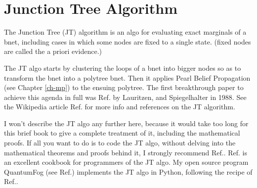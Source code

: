 \chapter{Junction Tree Algorithm}
\label{ch-junc-tree}
The Junction Tree (JT)
algorithm
is an algo
for evaluating
exact marginals
of a bnet, 
including cases in which
some nodes are fixed to a single state.
(fixed nodes
are called the a priori evidence.)

The JT algo
starts by  
clustering
the loops of a bnet into bigger nodes
so as  to
transform the bnet into a polytree bnet.
Then it applies
Pearl Belief Propagation (see
Chapter \ref{ch-mp}) to the ensuing polytree.
The first breakthrough 
paper to achieve this agenda in full
was Ref.\cite{lauritzen1988}
by Lauritzen, and Spiegelhalter in 1988.
See the Wikipedia article 
Ref.\cite{wiki-junc-tree}
for more info and
 references on the JT algorithm. 

I won't describe
the JT algo
any further here,
because it would take too
long for this brief book
to give a complete treatment
of it, including the mathematical proofs.
If all you want to do is to
code the JT algo, without
delving into the mathematical theorems
and proofs behind it, I 
strongly recommend 
Ref.\cite{huang1996}.
Ref.\cite{huang1996} is 
an excellent cookbook
for programmers of the JT algo. My
open source  
program QuantumFog (see Ref.\cite{qfog})
implements the
JT algo in Python, 
following the recipe of
Ref.\cite{huang1996}.